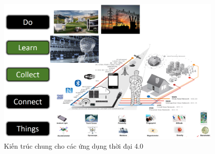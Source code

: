 \begin{figure}[!h]
    \centering
    \includegraphics[width=\textwidth]{Images/Intro/5layer.jpg}
    \caption{Kiến trúc chung cho các ứng dụng thời đại 4.0 \cite{iotp}}
    \label{fig:comp_mqtt}
\end{figure}

